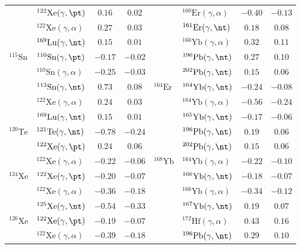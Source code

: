 {\begin{longtable}{llcc llcc}
$ $ & $^{122}\mathrm{Xe}(\gamma,\pt)$ & $0.16$ & $0.02$ & $ $ & $^{160}\mathrm{Er}(\gamma,\alpha)$ & $-0.40$ & $-0.13$ \\ 
$ $ & $^{122}\mathrm{Xe}(\gamma,\alpha)$ & $0.27$ & $0.03$ & $ $ & $^{161}\mathrm{Er}(\gamma,\nt)$ & $0.18$ & $0.08$ \\ 
$ $ & $^{169}\mathrm{Lu}(\gamma,\nt)$ & $0.15$ & $0.01$ & $ $ & $^{166}\mathrm{Yb}(\gamma,\alpha)$ & $0.32$ & $0.11$ \\ 
$^{115}\mathrm{Sn}$ & $^{110}\mathrm{Sn}(\gamma,\pt)$ & $-0.17$ & $-0.02$ & $ $ & $^{196}\mathrm{Pb}(\gamma,\nt)$ & $0.27$ & $0.10$ \\ 
$ $ & $^{110}\mathrm{Sn}(\gamma,\alpha)$ & $-0.25$ & $-0.03$ & $ $ & $^{202}\mathrm{Pb}(\gamma,\nt)$ & $0.15$ & $0.06$ \\ 
$ $ & $^{113}\mathrm{Sn}(\gamma,\nt)$ & $0.73$ & $0.08$ & $^{164}\mathrm{Er}$ & $^{164}\mathrm{Yb}(\gamma,\nt)$ & $-0.24$ & $-0.08$ \\ 
$ $ & $^{122}\mathrm{Xe}(\gamma,\alpha)$ & $0.24$ & $0.03$ & $ $ & $^{164}\mathrm{Yb}(\gamma,\alpha)$ & $-0.56$ & $-0.24$ \\ 
$ $ & $^{169}\mathrm{Lu}(\gamma,\nt)$ & $0.15$ & $0.01$ & $ $ & $^{165}\mathrm{Yb}(\gamma,\nt)$ & $-0.17$ & $-0.06$ \\ 
$^{120}\mathrm{Te}$ & $^{121}\mathrm{Te}(\gamma,\nt)$ & $-0.78$ & $-0.24$ & $ $ & $^{196}\mathrm{Pb}(\gamma,\nt)$ & $0.19$ & $0.06$ \\ 
$ $ & $^{122}\mathrm{Xe}(\gamma,\pt)$ & $0.24$ & $0.06$ & $ $ & $^{202}\mathrm{Pb}(\gamma,\nt)$ & $0.15$ & $0.06$ \\ 
$ $ & $^{122}\mathrm{Xe}(\gamma,\alpha)$ & $-0.22$ & $-0.06$ & $^{168}\mathrm{Yb}$ & $^{164}\mathrm{Yb}(\gamma,\alpha)$ & $-0.22$ & $-0.10$ \\ 
$^{124}\mathrm{Xe}$ & $^{122}\mathrm{Xe}(\gamma,\pt)$ & $-0.20$ & $-0.07$ & $ $ & $^{166}\mathrm{Yb}(\gamma,\nt)$ & $-0.18$ & $-0.07$ \\ 
$ $ & $^{122}\mathrm{Xe}(\gamma,\alpha)$ & $-0.36$ & $-0.18$ & $ $ & $^{166}\mathrm{Yb}(\gamma,\alpha)$ & $-0.34$ & $-0.12$ \\ 
$ $ & $^{125}\mathrm{Xe}(\gamma,\nt)$ & $-0.54$ & $-0.33$ & $ $ & $^{167}\mathrm{Yb}(\gamma,\nt)$ & $0.19$ & $0.07$ \\ 
$^{126}\mathrm{Xe}$ & $^{122}\mathrm{Xe}(\gamma,\pt)$ & $-0.19$ & $-0.07$ & $ $ & $^{172}\mathrm{Hf}(\gamma,\alpha)$ & $0.43$ & $0.16$ \\ 
$ $ & $^{122}\mathrm{Xe}(\gamma,\alpha)$ & $-0.39$ & $-0.18$ & $ $ & $^{196}\mathrm{Pb}(\gamma,\nt)$ & $0.29$ & $0.10$ \\ 

\end{longtable}}
